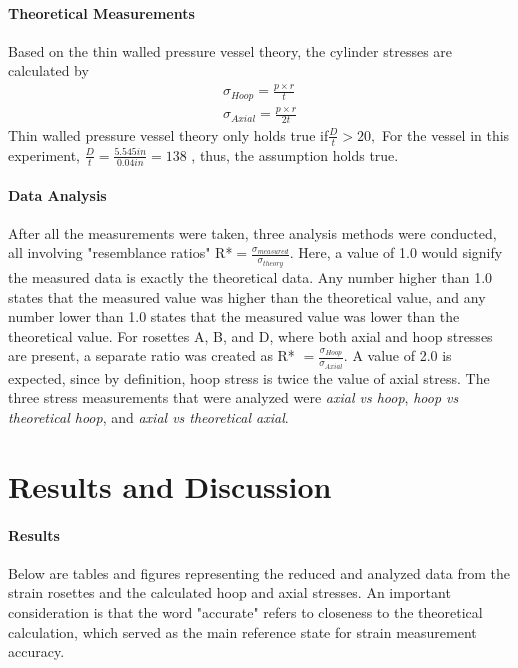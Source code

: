 \documentclass[12pt]{article}
\begin{document}
\paragraph {Theoretical Measurements} 
Based on the thin walled pressure vessel theory, the cylinder stresses are calculated by 
\begin{align}
\sigma_{Hoop} = \frac{p\times r}{t} \\ 
\sigma_{Axial} = \frac{p\times r}{2t}
\end{align}
Thin walled pressure vessel theory only holds true if$ \frac{D}{t} > 20, $ For the vessel in this experiment, $\frac{D}{t}=\frac{5.545 in}{0.04 in} = 138$ , thus, the assumption holds true. 

\paragraph{Data Analysis}
After all the measurements were taken, three analysis methods were conducted, all involving "resemblance ratios" R*$  = \frac{\sigma_{measured}}{\sigma_{theory}} $. Here, a value of 1.0 would signify the measured data is exactly the theoretical data. Any number higher than 1.0 states that the measured value was higher than the theoretical value, and any number lower than 1.0 states that the measured value was lower than the theoretical value. For rosettes A, B, and D, where both axial and hoop stresses are present, a separate ratio was created as R* $ = \frac{\sigma_{Hoop}}{\sigma_{Axial}} $. A value of 2.0 is expected, since by definition, hoop stress is twice the value of axial stress. The three stress measurements that were analyzed were \textit{axial vs hoop}, \textit{hoop vs theoretical hoop}, and  
\textit{axial vs theoretical axial}. 
\newpage

\section{Results and Discussion}\label{conclusions}
\paragraph {Results} 
Below are tables and figures representing the reduced and analyzed data from the strain rosettes and the calculated hoop and axial stresses. An important consideration is that the word "accurate" refers to closeness to the theoretical calculation, which served as the main reference state for strain measurement accuracy. 
\end{document}
